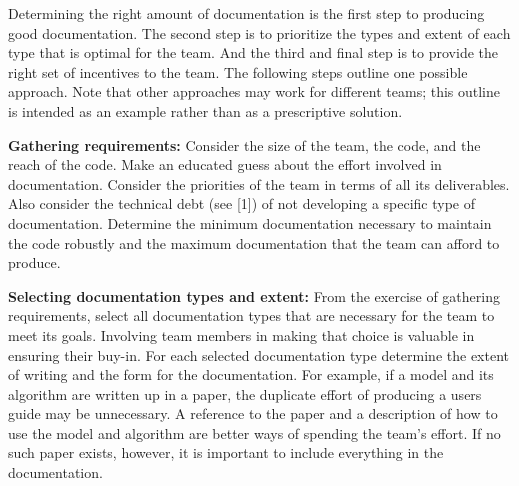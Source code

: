 \documentclass[]{article}
\date{}
\begin{document}
\pagestyle{fancy}
\renewcommand{\headrulewidth}{0pt}
  
\thispagestyle{empty}

\textbf{\newline}
Determining the right amount of documentation is the first step to
producing good documentation. The second step is to prioritize the types
and extent of each type that is optimal for the team. And the third and
final step is to provide the right set of incentives to the team. The
following steps outline one possible approach. Note that other
approaches may work for different teams; this outline is intended as an
example rather than as a prescriptive solution.

\textbf{Gathering requirements:} Consider
the size of the team, the code, and the reach of the code. Make an
educated guess about the effort involved in documentation. Consider the
priorities of the team in terms of all its deliverables. Also consider
the technical debt (see {[}1{]}) of not developing a specific type of
documentation. Determine the minimum documentation necessary to maintain
the code robustly and the maximum documentation that the team can afford
to produce.

\textbf{Selecting documentation types and
extent:} From the exercise of gathering requirements, select all
documentation types that are necessary for the team to meet its goals.
Involving team members in making that choice is valuable in ensuring
their buy-in. For each selected documentation type determine the extent
of writing and the form for the documentation. For example, if a model
and its algorithm are written up in a paper, the duplicate effort of
producing a users guide may be unnecessary. A reference to the paper and
a description of how to use the model and algorithm are better ways of
spending the team's effort. If no such paper exists, however, it is
important to include everything in the documentation.
\end{document}
